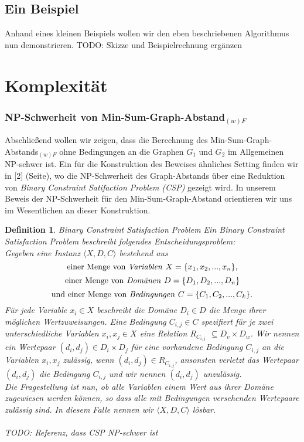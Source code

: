 \documentclass[a4paper, 12pt, twoside]{article}
\theoremstyle{Format1} %
\newtheorem{Def}{Definition}[section]       %
\begin{document}
\subsection{Ein Beispiel}
Anhand eines kleinen Beispiels wollen wir den eben beschriebenen Algorithmus nun demonstrieren.
TODO: Skizze und Beispielrechnung ergänzen

\section{Komplexität}

\subsubsection{NP-Schwerheit von Min-Sum-Graph-Abstand$_{(w)F}$}

Abschließend wollen wir zeigen, dass die Berechnung des Min-Sum-Graph-Abstands$_{(w)F}$ ohne Bedingungen an die Graphen $G_1$ und $G_2$ im Allgemeinen
NP-schwer ist. Ein für die Konstruktion des Beweises ähnliches Setting finden wir in [2] (Seite), wo die NP-Schwerheit des Graph-Abstands
über eine Reduktion von \textit{Binary Constraint Satifaction Problem (CSP)} gezeigt wird.
In unserem Beweis der NP-Schwerheit für den Min-Sum-Graph-Abstand orientieren wir uns im Wesentlichen an dieser Konstruktion.

\begin{Def}
	Binary Constraint Satisfaction Problem
	Ein \textit{Binary Constraint Satisfaction Problem} beschreibt folgendes Entscheidungsproblem:
	\\
	Gegeben eine Instanz $\langle X,D,C \rangle$ bestehend aus
	$$ \text{einer Menge von \textit{Variablen }}X = \{x_1, x_2, ..., x_n\},$$
	$$ \text{einer Menge von \textit{Domänen }}D = \{D_1, D_2, ..., D_n\} $$
	$$ \text{und einer Menge von \textit{Bedingungen }}C = \{C_1, C_2, ..., C_k\}. $$
	Für jede Variable $ x_i \in X$ beschreibt die Domäne $ D_i \in D$ die Menge ihrer möglichen Wertzuweisungen.
	Eine Bedingung $C_{i,j} \in C$ spezifiert für je zwei unterschiedliche Variablen $x_i, x_j \in X$ eine Relation $R_{C_{i,j}}$ $\subseteq D_v \times D_w$.
	Wir nennen ein Wertepaar $(d_i, d_j) \in D_i \times D_j$ für eine vorhandene Bedingung $C_{i,j}$ an die Variablen $x_i,x_j$ \textit{zulässig}, wenn $(d_i,d_j) \in R_{C_{i,j}}$,
	ansonsten \textit{verletzt} das Wertepaar $(d_i, d_j)$ die Bedingung $C_{i,j}$ und wir nennen $(d_i,d_j)$ \textit{unzulässig}.
	\\
	Die Fragestellung ist nun, ob alle Variablen einem Wert aus ihrer Domäne zugewiesen werden können, so dass alle mit Bedingungen versehenden Wertepaare zulässig sind.
	In diesem Falle nennen wir $\langle X,D,C \rangle$ \textit{lösbar}.
	\\
	\\
	TODO: Referenz, dass CSP NP-schwer ist
\end{Def}
\end{document}
